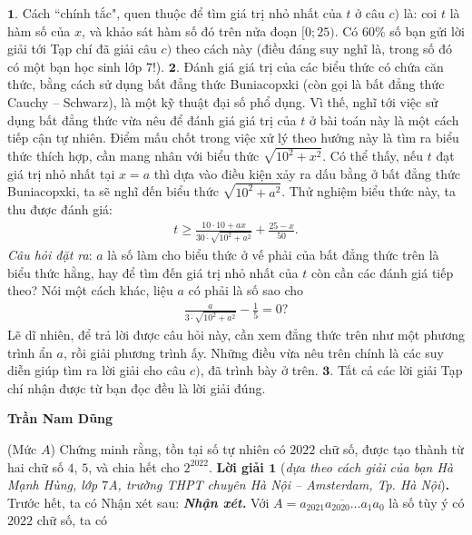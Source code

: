 \begin{multicols}{2}
	$\pmb{1.}$ Cách ``chính tắc", quen thuộc để tìm giá trị nhỏ nhất của $t$ ở câu $c)$ là: coi $t$ là hàm số của $x$, và khảo sát hàm số đó trên nửa đoạn $[0; 25)$. Có $60\%$ số bạn gửi lời giải tới Tạp chí đã giải câu $c)$ theo cách này (điều đáng suy nghĩ là, trong số đó có một bạn học sinh lớp $7$!).
	\vskip 0.05cm
	$\pmb{2.}$ Đánh giá giá trị của các biểu thức có chứa căn thức, bằng cách sử dụng bất đẳng thức Buniacopxki (còn gọi là bất đẳng thức Cauchy -- Schwarz), là một kỹ thuật đại số phổ dụng. Vì thế, nghĩ tới việc sử dụng bất đẳng thức vừa nêu để đánh giá giá trị của $t$ ở bài toán này là một cách tiếp cận tự nhiên. Điểm mấu chốt trong việc xử lý theo hướng này là tìm ra biểu thức thích hợp, cần mang nhân với biểu thức $\sqrt {{{10}^2} + {x^2}}$. Có thể thấy, nếu $t$ đạt giá trị nhỏ nhất tại $x = a$ thì dựa vào điều kiện xảy ra dấu bằng ở bất đẳng thức Buniacopxki, ta sẽ nghĩ đến biểu thức $\sqrt {{{10}^2} + {a^2}}$.  Thử nghiệm biểu thức này, ta thu được đánh giá:
	\begin{align*}
		t \ge \frac{{10 \cdot 10 + ax}}{{30 \cdot \sqrt {{{10}^2} + {a^2}} }} + \frac{{25 - x}}{{50}}.
	\end{align*}
	\textit{Câu hỏi đặt ra}: $a$ là số làm cho biểu thức ở vế phải của bất đẳng thức trên là biểu thức hằng, hay để tìm đến giá trị nhỏ nhất của $t$ còn cần các đánh giá tiếp theo? Nói một cách khác, liệu $a$ có phải là số sao cho
	\begin{align*}
		\frac{a}{{3 \cdot \sqrt {{{10}^2} + {a^2}} }} - \frac{1}{5} = 0?
	\end{align*}
	Lẽ dĩ nhiên, để trả lời được câu hỏi này, cần xem đẳng thức trên như một phương trình ẩn $a$, rồi giải phương trình ấy.
	\vskip 0.05cm
	Những điều vừa nêu trên chính là các suy diễn giúp tìm ra lời giải cho câu $c)$, đã trình bày ở trên.
	\vskip 0.05cm
	$\pmb{3.}$ Tất cả các lời giải Tạp chí nhận được từ bạn đọc đều là lời giải đúng.
	\begin{flushright}
		\textbf{\color{thachthuctoanhoc}Trần Nam Dũng}
	\end{flushright}
	{}
	(Mức $A$) Chứng minh rằng, tồn tại số tự nhiên có $2022$ chữ số, được tạo thành từ hai chữ số $4$, $5$, và chia hết cho $2^{2022}$. 
	\vskip 0.05cm
	\textbf{\color{thachthuctoanhoc}Lời giải $\pmb{1}$} (\textit{dựa theo cách giải của bạn Hà Mạnh Hùng, lớp $7$A, trường THPT chuyên Hà Nội -- Amsterdam, Tp. Hà Nội})\textbf{\color{thachthuctoanhoc}.}
	\vskip 0.05cm
	Trước hết, ta có Nhận xét sau:
	\vskip 0.05cm
	\textbf{\color{thachthuctoanhoc}\textit{Nhận xét.}} Với $A = \overline {{a_{2021}}{a_{2020}} \ldots {a_1}{a_0}} $  là số tùy ý có $2022$ chữ số, ta có

\end{multicols}
